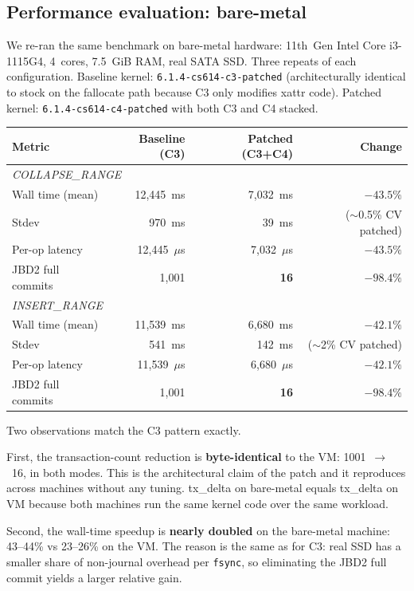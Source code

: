 \documentclass[11pt,a4paper]{article}
\begin{document}
\subsection{Performance evaluation: bare-metal}

We re-ran the same benchmark on bare-metal hardware: 11th~Gen Intel
Core i3-1115G4, 4~cores, 7.5~GiB RAM, real SATA SSD. Three repeats
of each configuration. Baseline kernel:
\texttt{6.1.4-cs614-c3-patched} (architecturally identical to stock
on the fallocate path because C3 only modifies xattr code). Patched
kernel: \texttt{6.1.4-cs614-c4-patched} with both C3 and C4 stacked.

\begin{center}
\begin{tabular}{lrrr}
\toprule
Metric & Baseline (C3) & Patched (C3+C4) & Change \\
\midrule
\multicolumn{4}{l}{\textit{COLLAPSE\_RANGE}} \\
Wall time (mean)     & 12{,}445~ms & 7{,}032~ms & $-43.5\%$ \\
Stdev                & 970~ms      & 39~ms      & ($\sim$0.5\% CV patched) \\
Per-op latency       & 12{,}445~$\mu$s & 7{,}032~$\mu$s & $-43.5\%$ \\
JBD2 full commits    & 1{,}001 & \textbf{16} & $\mathbf{-98.4\%}$ \\
\midrule
\multicolumn{4}{l}{\textit{INSERT\_RANGE}} \\
Wall time (mean)     & 11{,}539~ms & 6{,}680~ms & $-42.1\%$ \\
Stdev                & 541~ms      & 142~ms     & ($\sim$2\% CV patched) \\
Per-op latency       & 11{,}539~$\mu$s & 6{,}680~$\mu$s & $-42.1\%$ \\
JBD2 full commits    & 1{,}001 & \textbf{16} & $\mathbf{-98.4\%}$ \\
\bottomrule
\end{tabular}
\end{center}

Two observations match the C3 pattern exactly.

First, the transaction-count reduction is \textbf{byte-identical} to
the VM: 1001~$\to$~16, in both modes. This is the architectural
claim of the patch and it reproduces across machines without any
tuning. tx\_delta on bare-metal equals tx\_delta on VM because both
machines run the same kernel code over the same workload.

Second, the wall-time speedup is \textbf{nearly doubled} on the
bare-metal machine: 43--44\% vs 23--26\% on the VM. The reason is
the same as for C3: real SSD has a smaller share of non-journal
overhead per \texttt{fsync}, so eliminating the JBD2 full commit
yields a larger relative gain.
\end{document}
